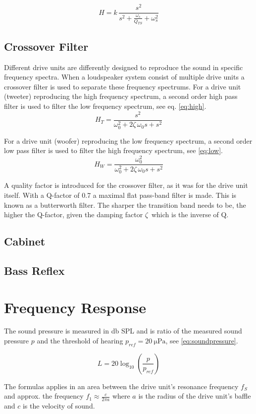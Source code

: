 \begin{equation}
H = k\,\dfrac{s^2}{s^2+\frac{\omega_s}{Q_{TS}}+\omega_s^2}
\label{eq:dutfderived}
\end{equation}

\subsection{Crossover Filter}
Different drive units are differently designed to reproduce the sound in specific frequency spectra.
When a loudspeaker system consist of multiple drive units a crossover filter is used to separate these frequency spectrums.
For a drive unit (tweeter) reproducing the high frequency spectrum, a second order high pass filter is used to filter the low frequency spectrum, see eq. \ref{eq:high}.\cite[p.~82-83]{Elektroakustik}
\begin{equation}
H_{T} = \frac{s^2}{\omega_0^2+2\zeta\,\omega_0 s+s^2}
\label{eq:high}
\end{equation}

For a drive unit (woofer) reproducing the low frequency spectrum, a second order low pass filter is used to filter the high frequency spectrum, see \cref{eq:low}.
\begin{equation}
H_{W} = \frac{\omega_0^2}{\omega_0^2+2\zeta\,\omega_0 s+s^2}
\label{eq:low}
\end{equation}

A quality factor is introduced for the crossover filter, as it was for the drive unit itself. 
With a Q-factor of 0.7 a maximal flat pass-band filter is made.
This is known as a butterworth filter. 
The sharper the transition band needs to be, the higher the Q-factor, given the damping factor $\zeta\,$ which is the inverse of Q. 

\subsection{Cabinet}

\subsection{Bass Reflex}

\section{Frequency Response}
The sound pressure is measured in \si{\decibel} SPL and is ratio of the measured sound pressure $p$ and the threshold of hearing $p_{ref}=\SI{20}{\micro\pascal}$, see \cref{eq:soundpressure}.

\begin{equation}
L=20\log_{10}\left(\frac{p}{p_{ref}}\right)
\label{eq:soundpressure}
\end{equation}

The formulas applies in an area between the drive unit's resonance frequency $f_S$ and approx. the frequency $f_1\approx\frac{c}{2\pi a}$ where $a$ is the radius of the drive unit's baffle and $c$ is the velocity of sound. \cite[p.~41]{Elektroakustik}



\FloatBarrier
